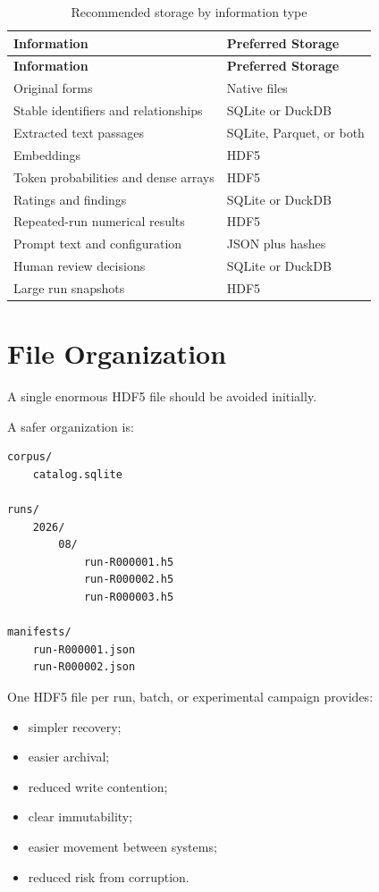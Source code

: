 \documentclass[11pt]{report}
\begin{document}
\begin{longtable}{p{}p{}}
\caption{Recommended storage by information type}
\label{tab:storage}\\
\toprule
\textbf{Information} & \textbf{Preferred Storage}\\
\midrule
\endfirsthead

\toprule
\textbf{Information} & \textbf{Preferred Storage}\\
\midrule
\endhead

Original forms & Native files\\
Stable identifiers and relationships & SQLite or DuckDB\\
Extracted text passages & SQLite, Parquet, or both\\
Embeddings & HDF5\\
Token probabilities and dense arrays & HDF5\\
Ratings and findings & SQLite or DuckDB\\
Repeated-run numerical results & HDF5\\
Prompt text and configuration & JSON plus hashes\\
Human review decisions & SQLite or DuckDB\\
Large run snapshots & HDF5\\
\bottomrule
\end{longtable}

\chapter{File Organization}

A single enormous HDF5 file should be avoided initially.

A safer organization is:

\begin{verbatim}
corpus/
    catalog.sqlite

runs/
    2026/
        08/
            run-R000001.h5
            run-R000002.h5
            run-R000003.h5

manifests/
    run-R000001.json
    run-R000002.json
\end{verbatim}

One HDF5 file per run, batch, or experimental campaign provides:

\begin{itemize}
  \item simpler recovery;
  \item easier archival;
  \item reduced write contention;
  \item clear immutability;
  \item easier movement between systems;
  \item reduced risk from corruption.
\end{itemize}
\end{document}

